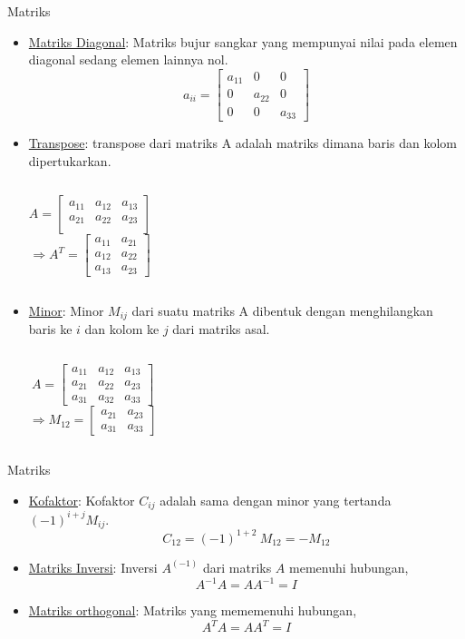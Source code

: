 \documentclass{beamer}
\begin{document}
\begin{frame}[t,fragile]{Matriks}
\begin{itemize}
\item \underline{Matriks Diagonal}: Matriks bujur sangkar yang mempunyai nilai pada elemen diagonal sedang elemen lainnya nol.
$$ a_{ii} = \begin{bmatrix}
       	a_{11} & 0 & 0 \\
	    0 & a_{22} & 0 \\
	    0 & 0 & a_{33} 
        \end{bmatrix} $$
\item \underline{Transpose}: transpose dari matriks A adalah matriks dimana baris dan kolom dipertukarkan.
\begin{columns}
$$ A = \begin{bmatrix}
       	a_{11} & a_{12} & a_{13}\\
	    a_{21} & a_{22} & a_{23}\\
        \end{bmatrix} $$
$$ \Longrightarrow A^T = \begin{bmatrix}
       	a_{11} & a_{21}\\
	    a_{12} & a_{22}\\
        a_{13} & a_{23} 
        \end{bmatrix} $$
\end{columns}
\item \underline{Minor}: Minor $M_{ij}$ dari suatu matriks A dibentuk dengan menghilangkan baris ke $i$ dan kolom ke $j$ dari matriks asal.
\begin{columns}
$$ A = \begin{bmatrix}
       	a_{11} & a_{12} & a_{13}\\
	    a_{21} & a_{22} & a_{23}\\
        a_{31} & a_{32} & a_{33} 
        \end{bmatrix} $$
$$ \Longrightarrow M_{12} = \begin{bmatrix}
       	a_{21} & a_{23}\\
        a_{31} & a_{33} 
        \end{bmatrix} $$
\end{columns}
\end{itemize}
\end{frame}

\begin{frame}[t,fragile]{Matriks}
\begin{itemize}
\item \underline{Kofaktor}: Kofaktor $C_{ij}$ adalah sama dengan minor yang tertanda $(-1)^{i+j} M_{ij}$.\\
    $$ C_{12} = (-1)^{1+2} ~ M_{12} = - M_{12} $$
\item \underline{Matriks Inversi}: Inversi $A^{(-1)}$ dari matriks $A$ memenuhi hubungan,\\ 
    $$ A^{-1} A = A A^{-1} = I $$
\item \underline{Matriks orthogonal}: Matriks yang mememenuhi hubungan,\\
    $$ A^T A = A A^T = I$$ 
\end{itemize}
\end{frame}
\end{document}
